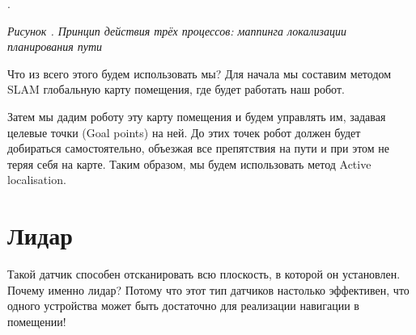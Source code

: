\documentclass[a4paper]{article}
\newcounter{qwerty}
\renewcommand\theqwerty{\arabic{qwerty}}
\begin{document}
.\textcolor{black}{ }


{\centering\itshape\color[HTML]{44546A}
\label{bkm:Ref127518730}Рисунок \stepcounter{qwerty}{\theqwerty}. Принцип действия трёх процессов: маппинга локализации
планирования пути \ 
\par}

Что из всего этого будем использовать мы? Для начала мы составим методом SLAM глобальную карту помещения, где будет
работать наш робот.

Затем мы дадим роботу эту карту помещения и будем управлять им, задавая целевые точки (Goal points) на ней. До этих
точек робот должен будет добираться самостоятельно, объезжая все препятствия на пути и при этом не теряя себя на карте.
Таким образом, мы будем использовать метод Active localisation.

\section{Лидар}
Такой датчик способен отсканировать всю плоскость, в которой он установлен. Почему именно лидар? Потому что этот тип
датчиков настолько эффективен, что одного устройства может быть достаточно для реализации навигации в помещении!


\end{document}
